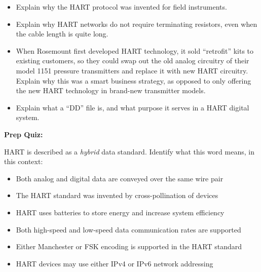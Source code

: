 \begin{itemize}
\item{} Explain why the HART protocol was invented for field instruments.
\item{} Explain why HART networks do not require terminating resistors, even when the cable length is quite long.
\item{} When Rosemount first developed HART technology, it sold ``retrofit'' kits to existing customers, so they could swap out the old analog circuitry of their model 1151 pressure transmitters and replace it with new HART circuitry.  Explain why this was a smart business strategy, as opposed to only offering the new HART technology in brand-new transmitter models.
\item{} Explain what a ``DD'' file is, and what purpose it serves in a HART digital system.
\end{itemize}






\vfil \eject

\noindent
{\bf Prep Quiz:}

HART is described as a {\it hybrid} data standard.  Identify what this word means, in this context:

\begin{itemize}
\item{} Both analog and digital data are conveyed over the same wire pair
\vskip 5pt 
\item{} The HART standard was invented by cross-pollination of devices
\vskip 5pt 
\item{} HART uses batteries to store energy and increase system efficiency
\vskip 5pt 
\item{} Both high-speed and low-speed data communication rates are supported
\vskip 5pt 
\item{} Either Manchester or FSK encoding is supported in the HART standard
\vskip 5pt 
\item{} HART devices may use either IPv4 or IPv6 network addressing
\end{itemize}



